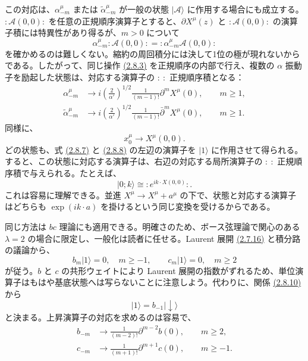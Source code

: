 この対応は、$\alpha_{-m}^\mu$ または $\widetilde\alpha_{-m}^\mu$ が一般の状態 $\lvert\mathcal A\rangle$ に作用する場合にも成立する。$: \mathcal A(0,0):$ を任意の正規順序演算子とすると、$\partial X^\mu(z)$ と $:\mathcal A(0,0):$ の演算子積には特異性があり得るが、$m>0$ について
\begin{equation}
\alpha_{-m}^\mu:\mathcal A(0,0):
=:\alpha_{-m}^\mu\mathcal A(0,0):
\tag{2.8.6}\label{eq:2.8.6}
\end{equation}
を確かめるのは難しくない。縮約の周回積分には決して1位の極が現れないからである。したがって、同じ操作 \hyperref[eq:2.8.3]{(2.8.3)} を正規順序の内部で行え、複数の $\alpha$ 振動子を励起した状態は、対応する演算子の $:\ :$ 正規順序積となる：
\begin{align}
\alpha_{-m}^\mu&\longrightarrow
i\left(\frac2{\alpha'}\right)^{1/2}
\frac1{(m-1)!}\partial^mX^\mu(0),\qquad m\geq1,
\tag{2.8.7a}\label{eq:2.8.7a}\\
\widetilde\alpha_{-m}^\mu&\longrightarrow
i\left(\frac2{\alpha'}\right)^{1/2}
\frac1{(m-1)!}\bar\partial^mX^\mu(0),\qquad m\geq1.
\tag{2.8.7b}\label{eq:2.8.7b}
\end{align}
同様に、
\begin{equation}
x_0^\mu\longrightarrow X^\mu(0,0).
\tag{2.8.8}\label{eq:2.8.8}
\end{equation}
どの状態も、式 \hyperref[eq:2.8.7a]{(2.8.7)} と \hyperref[eq:2.8.8]{(2.8.8)} の左辺の演算子を $\lvert1\rangle$ に作用させて得られる。すると、この状態に対応する演算子は、右辺の対応する局所演算子の $:\ :$ 正規順序積で与えられる。たとえば、
\begin{equation}
\lvert0;k\rangle\cong:e^{ik\cdot X(0,0)}:.
\tag{2.8.9}\label{eq:2.8.9}
\end{equation}
これは容易に理解できる。並進 $X^\mu\to X^\mu+a^\mu$ の下で、状態と対応する演算子はどちらも $\exp(ik\cdot a)$ を掛けるという同じ変換を受けるからである。

同じ方法は $bc$ 理論にも適用できる。明確さのため、ボース弦理論で関心のある $\lambda=2$ の場合に限定し、一般化は読者に任せる。Laurent 展開 \hyperref[eq:2.7.16]{(2.7.16)} と積分路の議論から、
\begin{equation}
b_m\lvert1\rangle=0,\quad m\geq-1,\qquad
c_m\lvert1\rangle=0,\quad m\geq2
\tag{2.8.10}\label{eq:2.8.10}
\end{equation}
が従う。$b$ と $c$ の共形ウェイトにより Laurent 展開の指数がずれるため、単位演算子はもはや基底状態へは写らないことに注意しよう。代わりに、関係 \hyperref[eq:2.8.10]{(2.8.10)} から
\begin{equation}
\lvert1\rangle=b_{-1}\lvert\downarrow\rangle
\tag{2.8.11}\label{eq:2.8.11}
\end{equation}
と決まる。上昇演算子の対応を求めるのは容易で、
\begin{align}
b_{-m}&\longrightarrow\frac1{(m-2)!}\partial^{m-2}b(0),
\qquad m\geq2,
\tag{2.8.12a}\label{eq:2.8.12a}\\
c_{-m}&\longrightarrow\frac1{(m+1)!}\partial^{m+1}c(0),
\qquad m\geq-1.
\tag{2.8.12b}\label{eq:2.8.12b}
\end{align}

